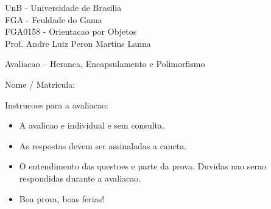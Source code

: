 \begin{examtop}
UnB - Universidade de Brasilia\\
FGA - Fculdade do Gama\\
FGA0158 - Orientacao por Objetos\\
Prof. Andre Luiz Peron Martins Lanna
\vspace{0.5cm}
\begin{center}
Avaliacao -- Heranca, Encapsulamento e Polimorfismo
\end{center}
\vspace{0.5cm}
Nome / Matricula: \hrulefill 
\vspace{0.5cm} 
\begin{center}
Instrucoes para a avaliacao:
\end{center}
\begin{itemize}
\item A avalicao e individual e sem consulta.
\item As respostas devem ser assinaladas a caneta.
\item O entendimento das questoes e parte da prova. Duvidas nao serao respondidas durante a avaliacao.
\item Boa prova, boas ferias!
\end{itemize}
\hrulefill
\end{examtop}
